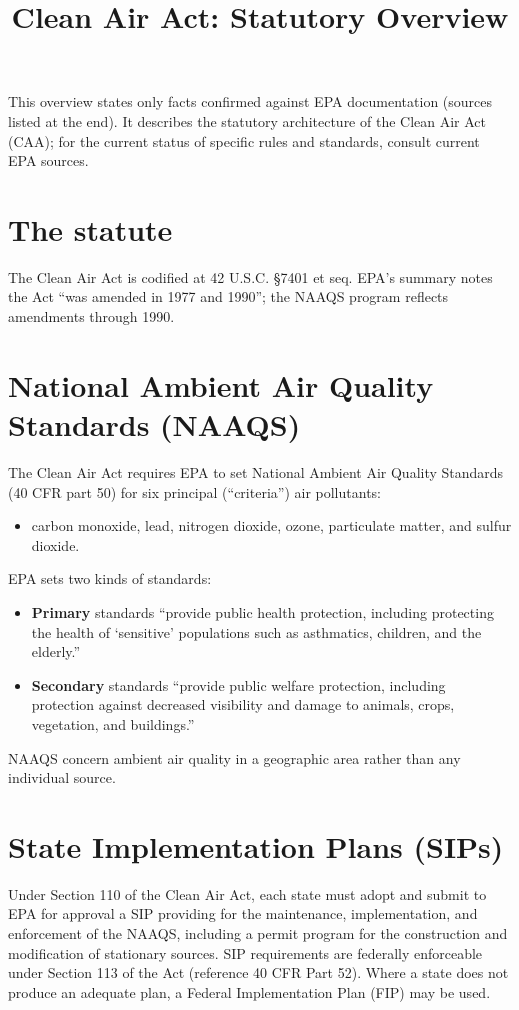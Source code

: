 \documentclass[11pt]{article}
\title{Clean Air Act: Statutory Overview}
\author{}
\date{}
\begin{document}
\maketitle

\noindent This overview states only facts confirmed against EPA documentation (sources listed at the
end). It describes the statutory architecture of the Clean Air Act (CAA); for the current status of
specific rules and standards, consult current EPA sources.

\section*{The statute}
The Clean Air Act is codified at 42 U.S.C. \S7401 et seq. EPA's summary notes the Act ``was amended in
1977 and 1990''; the NAAQS program reflects amendments through 1990.

\section*{National Ambient Air Quality Standards (NAAQS)}
The Clean Air Act requires EPA to set National Ambient Air Quality Standards (40 CFR part 50) for six
principal (``criteria'') air pollutants:
\begin{itemize}
  \item carbon monoxide, lead, nitrogen dioxide, ozone, particulate matter, and sulfur dioxide.
\end{itemize}
EPA sets two kinds of standards:
\begin{itemize}
  \item \textbf{Primary} standards ``provide public health protection, including protecting the health of
  `sensitive' populations such as asthmatics, children, and the elderly.''
  \item \textbf{Secondary} standards ``provide public welfare protection, including protection against
  decreased visibility and damage to animals, crops, vegetation, and buildings.''
\end{itemize}
NAAQS concern ambient air quality in a geographic area rather than any individual source.

\section*{State Implementation Plans (SIPs)}
Under Section 110 of the Clean Air Act, each state must adopt and submit to EPA for approval a SIP
providing for the maintenance, implementation, and enforcement of the NAAQS, including a permit program
for the construction and modification of stationary sources. SIP requirements are federally enforceable
under Section 113 of the Act (reference 40 CFR Part 52). Where a state does not produce an adequate plan,
a Federal Implementation Plan (FIP) may be used.
\end{document}

